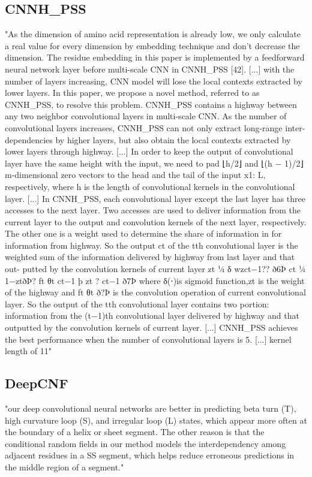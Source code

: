 \documentclass[]{scrartcl}
\begin{document}
\subsection{CNNH\_PSS}
"As the dimension of amino acid representation is already low, we only calculate a real value for every dimension by embedding technique and don’t decrease the dimension. The residue embedding in this paper is implemented by a feedforward neural network layer before multi-scale CNN in CNNH\_PSS [42].
[...]
with the number of layers increasing, CNN model will lose the local contexts extracted by lower layers. In this paper, we propose a novel method, referred to as CNNH\_PSS, to resolve this problem. CNNH\_PSS contains a highway between any two neighbor convolutional layers in multi-scale CNN. As the number of convolutional layers increases, CNNH\_PSS can not only extract long-range inter- dependencies by higher layers, but also obtain the local contexts extracted by lower layers through highway.
[...]
In order to keep the output of convolutional layer have the same height with the input, we need to pad ⌊h/2⌋ and ⌊(h − 1)/2⌋ m-dimensional zero vectors to the head and the tail of the input x1: L, respectively, where h is the length of convolutional kernels in the convolutional layer.
[...]
In CNNH\_PSS, each convolutional layer except the last layer has three accesses to the next layer. Two accesses are used to deliver information from the current layer to the output and convolution kernels of the next layer, respectively. The other one is a weight used to determine the share of information in for information from highway. So the output ct of the tth convolutional layer is the weighted sum of the information delivered by highway from last layer and that out- putted by the convolution kernels of current layer zt ¼ δ wzct−1??
ð6Þ
ct ¼ 1−ztðÞ? ft θt ct−1 þ zt ? ct−1
ð7Þ
where δ(⋅)is sigmoid function,zt is the weight of the highway and ft θt ð?Þ is the convolution operation of current convolutional layer. So the output of the tth convolutional layer contains two portion: information from the (t−1)th convolutional layer delivered by highway and that outputted by the convolution kernels of current layer.
[...]
CNNH\_PSS achieves the best performance when the number of convolutional layers is 5.
[...]
kernel length of 11" \cite{Zhou2018}

\subsection{DeepCNF} \label{DeepCNF}
"our deep convolutional neural networks are better in predicting beta turn (T), high curvature loop (S), and irregular loop (L) states, which appear more often at the boundary of a helix or sheet segment. The other reason is that the conditional random fields in our method models the interdependency among adjacent residues in a SS segment, which helps reduce erroneous predictions in the middle region of a segment." \cite{Wang2016}
\end{document}
